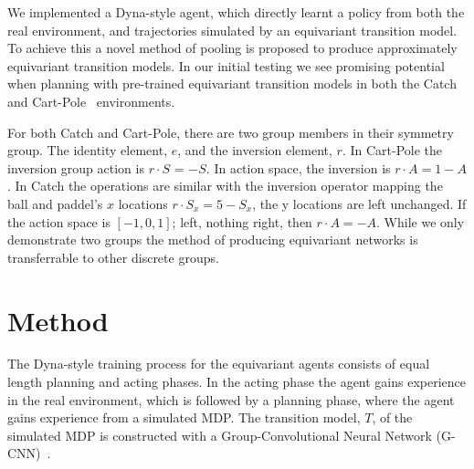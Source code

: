 \documentclass[mlabstract]{jmlr}
\begin{document}
We implemented a Dyna-style agent, which directly learnt a policy from both the real environment, and trajectories simulated by an equivariant transition model. To achieve this a novel method of pooling is proposed to produce approximately equivariant transition models. In our initial testing we see promising potential when planning with pre-trained equivariant transition models in both the Catch~\cite{osband2020bsuite} and Cart-Pole~\cite{barto1983neuronlike, florian2007correct} environments.

For both Catch and Cart-Pole, there are two group members in their symmetry group. The identity element, $e$, and the inversion element, $r$. In Cart-Pole the inversion group action is $r \cdot S$ = $ - S$. In action space, the inversion is $r \cdot A = 1 - A$. In Catch the operations are similar with the inversion operator mapping the ball and paddel's $x$ locations $r \cdot S_x = 5- S_x$, the y locations are left unchanged. If the action space is $[-1, 0, 1]$; left, nothing right, then $r \cdot A = - A$. While we only demonstrate two groups the method of producing equivariant networks is transferrable to other discrete groups.
\vspace{-10}
\section{Method}
The Dyna-style training process for the equivariant agents consists of equal length planning and acting phases. In the acting phase the agent gains experience in the real environment, which is followed by a planning phase, where the agent gains experience from a simulated MDP. The transition model, $T$, of the simulated MDP is constructed with a Group-Convolutional Neural Network (G-CNN)~\cite{cohen2016group}.
\end{document}
